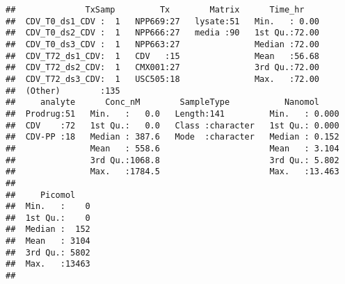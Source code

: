 \documentclass[]{article}
\newenvironment{Shaded}{\begin{snugshade}}{\end{snugshade}}
\newcommand{\CommentTok}[1]{\textcolor[rgb]{0.56,0.35,0.01}{\textit{#1}}}
\newcommand{\ControlFlowTok}[1]{\textcolor[rgb]{0.13,0.29,0.53}{\textbf{#1}}}
\newcommand{\DecValTok}[1]{\textcolor[rgb]{0.00,0.00,0.81}{#1}}
\newcommand{\KeywordTok}[1]{\textcolor[rgb]{0.13,0.29,0.53}{\textbf{#1}}}
\newcommand{\NormalTok}[1]{#1}
\newcommand{\OperatorTok}[1]{\textcolor[rgb]{0.81,0.36,0.00}{\textbf{#1}}}
\newcommand{\StringTok}[1]{\textcolor[rgb]{0.31,0.60,0.02}{#1}}
\begin{document}
\begin{Shaded}
\end{Shaded}

\begin{verbatim}
##              TxSamp         Tx        Matrix      Time_hr     
##  CDV_T0_ds1_CDV :  1   NPP669:27   lysate:51   Min.   : 0.00  
##  CDV_T0_ds2_CDV :  1   NPP666:27   media :90   1st Qu.:72.00  
##  CDV_T0_ds3_CDV :  1   NPP663:27               Median :72.00  
##  CDV_T72_ds1_CDV:  1   CDV   :15               Mean   :56.68  
##  CDV_T72_ds2_CDV:  1   CMX001:27               3rd Qu.:72.00  
##  CDV_T72_ds3_CDV:  1   USC505:18               Max.   :72.00  
##  (Other)        :135                                          
##     analyte      Conc_nM        SampleType           Nanomol      
##  Prodrug:51   Min.   :   0.0   Length:141         Min.   : 0.000  
##  CDV    :72   1st Qu.:   0.0   Class :character   1st Qu.: 0.000  
##  CDV-PP :18   Median : 387.6   Mode  :character   Median : 0.152  
##               Mean   : 558.6                      Mean   : 3.104  
##               3rd Qu.:1068.8                      3rd Qu.: 5.802  
##               Max.   :1784.5                      Max.   :13.463  
##                                                                   
##     Picomol     
##  Min.   :    0  
##  1st Qu.:    0  
##  Median :  152  
##  Mean   : 3104  
##  3rd Qu.: 5802  
##  Max.   :13463  
## 
\end{verbatim}
\end{document}
